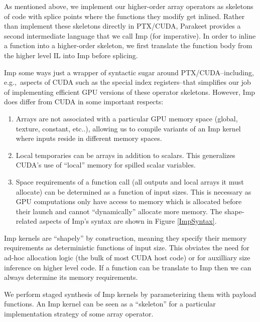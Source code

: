\documentclass[preprint]{sigplanconf}
\begin{document}
As mentioned above, we implement our higher-order array operators as skeletons
of code with splice points where the functions they modify get inlined.  Rather
than implement these skeletons directly in PTX/CUDA, Parakeet
provides a second intermediate language that we call Imp (for imperative).  In
order to inline a function into a higher-order skeleton, we first translate the
function body from the higher level IL into Imp before splicing.

Imp some ways just a wrapper of syntactic sugar around
PTX/CUDA--including, e.g.,~aspects of CUDA such as the special index
registers--that simplifies our job of implementing efficient GPU versions of
these operator skeletons. However, Imp does differ from CUDA in some important
respects:

\begin{enumerate}
\item  Arrays are not associated with a particular GPU memory space (global,
texture, constant, etc..), allowing us to compile variants of an Imp kernel
where inputs reside in different memory spaces.

\item Local temporaries can be arrays in addition to scalars. This generalizes
CUDA's use of ``local'' memory for spilled scalar variables.

\item Space requirements of a function call (all outputs and local arrays it
must allocate) can be determined as a function of input sizes. This is necessary
as GPU computations only have access to memory which is allocated before their
launch and cannot ``dynamically'' allocate more memory.  The shape-related
aspects of Imp's syntax are shown in Figure \ref{ImpSyntax}.
\end{enumerate}
Imp kernels are ``shapely'' by construction, meaning they specify their memory
requirements as deterministic functions of input size. This obviates the
need for ad-hoc allocation logic (the bulk of most CUDA host code) or for
auxilliary size inference on higher level code. If a function can be translate
to Imp then we can always determine its memory requirements.

We perform staged synthesis of Imp kernels by parameterizing them with payload
functions. An Imp kernel can be seen as a ``skeleton'' \cite{Cole04} for a
particular implementation strategy of some array operator.
\end{document}
